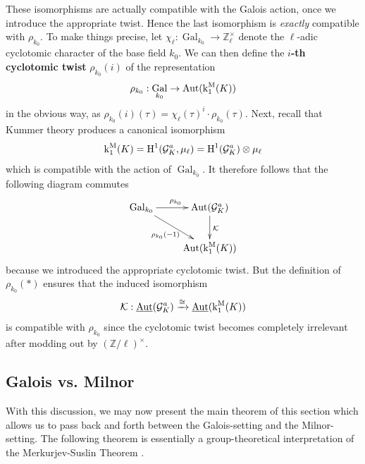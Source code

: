 \documentclass[11pt]{amsart}
\theoremstyle{definition}
\theoremstyle{remark}
\numberwithin{equation}{section}
\DeclareMathOperator{\Aut}{Aut}
\DeclareMathOperator{\Gal}{Gal}
\renewcommand{\H}{\operatorname{H}}
\newcommand{\Z}{\mathbb{Z}}
\newcommand{\Gc}{\mathcal{G}}
\newcommand{\Kummer}{\mathcal{K}}
\newcommand{\UAut}{\underline{\Aut}}
\renewcommand{\k}{\operatorname{k}^{\rm M}}
\newcommand{\Galk}{{\Gal_{k_0}}}
\begin{document}
These isomorphisms are actually compatible with the Galois action, once we introduce the appropriate twist.
Hence the last isomorphism is \emph{exactly} compatible with $\rho_{k_0}$.
To make things precise, let $\chi_\ell : \Galk \rightarrow \Z_\ell^\times$ denote the $\ell$-adic cyclotomic character of the base field $k_0$.
We can then define the {\bf $i$-th cyclotomic twist} $\rho_{k_0}(i)$ of the representation 
\[ \rho_{k_0} : \Galk \rightarrow \Aut(\k_1(K)) \]
in the obvious way, as $\rho_{k_0}(i)(\tau) = \chi_\ell(\tau)^i \cdot \rho_{k_0}(\tau)$.
Next, recall that Kummer theory produces a canonical isomorphism 
\[ \k_1(K) = \H^1(\Gc_K^a,\mu_\ell) = \H^1(\Gc_K^a)\otimes \mu_\ell \]
which is compatible with the action of $\Galk$.
It therefore follows that the following diagram commutes
\[\xymatrix{
  \Galk \ar[r]^{\rho_{k_0}} \ar[dr]_{\rho_{k_0}(-1)} & \Aut(\Gc_K^a) \ar[d]^{\Kummer} \\
  {} & \Aut(\k_1(K))
}\]
because we introduced the appropriate cyclotomic twist.
But the definition of $\rho_{k_0}(*)$ ensures that the induced isomorphism 
\[ \Kummer : \UAut(\Gc_K^a) \xrightarrow{\cong} \UAut(\k_1(K)) \]
is compatible with $\rho_{k_0}$ since the cyclotomic twist becomes completely irrelevant after modding out by $(\Z/\ell)^\times$.

\subsection{Galois vs. Milnor}
\label{subsection: cohom / galois-to-milnor}
With this discussion, we may now present the main theorem of this section which allows us to pass back and forth between the Galois-setting and the Milnor-setting.
The following theorem is essentially a group-theoretical interpretation of the Merkurjev-Suslin Theorem \cite{Merkurjev:1982}.
\end{document}
